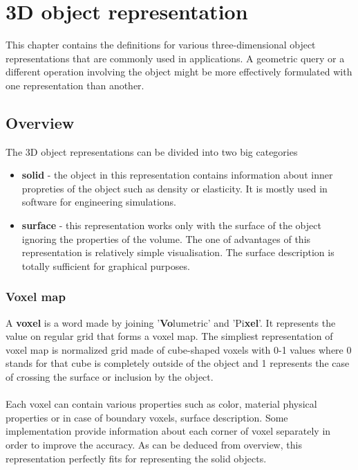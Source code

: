 \chapter{3D object representation}

This chapter contains the definitions for various three-dimensional object representations
that are commonly used in applications. A geometric query or a different operation involving the
object might be more effectively formulated with one representation than another.

\section{Overview}

The 3D object representations can be divided into two big categories

\begin{itemize}
\item \textbf{solid} - the object in this representation contains information about inner
propreties of the object such as density or elasticity. It is mostly used in software for
engineering simulations.

\item \textbf{surface} - this representation works only with the surface of the object
ignoring the properties of the volume. The one of advantages of this representation is
relatively simple visualisation. The surface description is totally sufficient for graphical purposes.
\end{itemize}

\subsection{Voxel map}

A \textbf{voxel} is a word made by joining '\textbf{Vo}lumetric' and 'Pi\textbf{xel}'. It represents
the value on regular grid that forms a voxel map. The simpliest representation of voxel map is
normalized grid made of cube-shaped voxels with 0-1 values where 0 stands for that cube is completely
outside of the object and 1 represents the case of crossing the surface or inclusion by the object.
\\
\\
Each voxel can contain various properties such as color, material physical properties or
in case of boundary voxels, surface description. Some implementation provide information about
each corner of voxel separately in order to improve the accuracy.
As can be deduced from overview, this representation perfectly fits for representing the solid objects.

